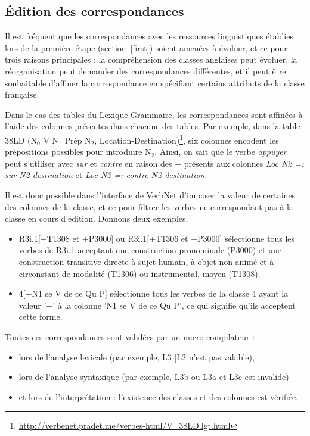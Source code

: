 \subsection{Édition des correspondances}

Il est fréquent que les correspondances avec les ressources linguistiques
établies lors de la première étape (section~\ref{first}) soient amenées à
évoluer, et ce pour trois raisons principales : la compréhension des classes
anglaises peut évoluer, la réorganisation peut demander des correspondances
différentes, et il peut être souhaitable d'affiner la correspondance en
spécifiant certains attributs de la classe française.

Dans le cas des tables du Lexique-Grammaire, les correspondances sont affinées
à l'aide des colonnes présentes dans chacune des tables. Par exemple, dans la
table 38LD (N$_0$ V N$_1$ Prép N$_2$,
Location-Destination)\footnote{\url{http://verbenet.pradet.me/verbes-html/V_38LD.lgt.html}},
six colonnes encodent les prépositions possibles pour introduire N$_2$.  Ainsi,
on sait que le verbe \textit{appuyer} peut s'utiliser avec \textit{sur} et
\textit{contre} en raison des + présents aux colonnes \textit{Loc N2 =: sur N2
destination} et \textit{Loc N2 =: contre N2 destination}.

Il est donc possible dans l'interface de VerbNet d'imposer la valeur de
certaines des colonnes de la classe, et ce pour filtrer les verbes ne
correspondant pas à la classe \verbenet{} en cours d'édition. Donnons deux
exemples.

\begin{itemize}
    \item R3i.1[+T1308 et +P3000] ou R3i.1[+T1306 et +P3000] sélectionne tous
        les verbes de R3i.1 acceptant une construction pronominale (P3000) et
        une construction transitive directe à sujet humain, à objet non animé
        et à circonstant de modalité (T1306) ou instrumental, moyen (T1308).
    \item 4[+N1 se V de ce Qu P] sélectionne tous les verbes de la classe 
        4 ayant la valeur '+' à la colonne 'N1 se V de ce Qu P', ce qui
        signifie qu'ils acceptent cette forme.
\end{itemize}

Toutes ces correspondances sont validées par un micro-compilateur :

\begin{itemize}
    \item lors de l'analyse lexicale (par exemple, L3 [L2 n'est pas valable),
    \item lors de l'analyse syntaxique (par exemple, L3b ou L3a et L3c est invalide)
    \item et lors de l'interprétation : l'existence des classes et des colonnes
        est vérifiée.
\end{itemize}

